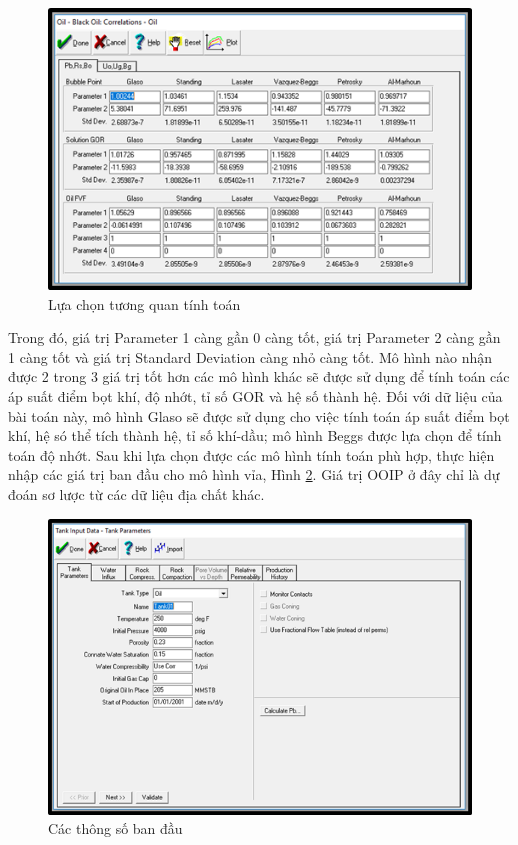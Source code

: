\documentclass[12pt,a4paper]{report}
\begin{document}
		\begin{figure}[h]
        	\centering
            \includegraphics[scale=1.1]{Fig/correlations.png}
            \caption{Lựa chọn tương quan tính toán}
            \label{fig:correlations}
        \end{figure}
        \newline
Trong đó, giá trị Parameter 1 càng gần 0 càng tốt, giá trị Parameter 2 càng gần 1 càng tốt và giá trị Standard Deviation càng nhỏ càng tốt. Mô hình nào nhận được 2 trong 3 giá trị tốt hơn các mô hình khác sẽ được sử dụng để tính toán các áp suất điểm bọt khí, độ nhớt, tỉ số GOR và hệ số thành hệ. Đối với dữ liệu của bài toán này, mô hình Glaso sẽ được sử dụng cho việc tính toán áp suất điểm bọt khí, hệ só thể tích thành hệ, tỉ số khí-dầu; mô hình Beggs được lựa chọn để tính toán độ nhớt.
		\newpage
        \noindent
Sau khi lựa chọn được các mô hình tính toán phù hợp, thực hiện nhập các giá trị ban đầu cho mô hình vỉa, Hình \ref{fig:tank_params}. Giá trị OOIP ở đây chỉ là dự đoán sơ lược từ các dữ liệu địa chất khác.
		\begin{figure}[h]
        	\centering
            \includegraphics[scale=1]{Fig/tank_params.png}
            \caption{Các thông số ban đầu}
            \label{fig:tank_params}
        \end{figure}
\end{document}
